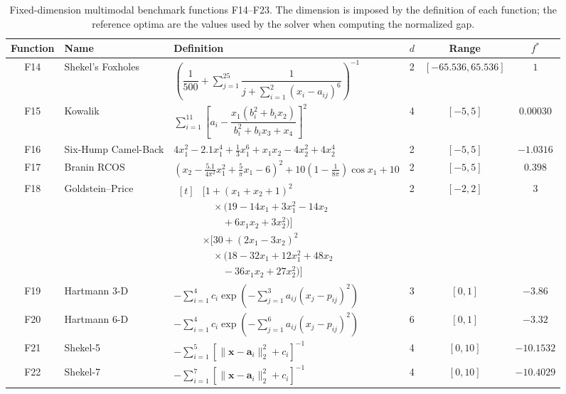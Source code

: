 \begin{table}[H]
\centering
\small
\caption{Fixed-dimension multimodal benchmark functions F14--F23. The dimension is imposed by the definition of each function; the reference optima are the values used by the solver when computing the normalized gap.}
\label{tab:benchmark_fixed}
\setlength{\tabcolsep}{4pt}
\begin{tabularx}{\textwidth}{c>{\raggedright\arraybackslash}p{2.1cm}>{\footnotesize\raggedright\arraybackslash}X ccc}
\toprule
\textbf{Function} & \textbf{Name} & \textbf{Definition} & \boldmath$d$ & \textbf{Range} & \boldmath$f^{*}$ \\
\midrule
F14 & Shekel's Foxholes & $\left(\dfrac{1}{500}+\sum_{j=1}^{25}\dfrac{1}{j+\sum_{i=1}^{2}(x_i-a_{ij})^{6}}\right)^{-1}$ & 2 & $[-65.536,65.536]$ & $1$ \\
F15 & Kowalik & $\sum_{i=1}^{11}\left[a_i-\dfrac{x_1\left(b_i^{2}+b_i x_2\right)}{b_i^{2}+b_i x_3+x_4}\right]^{2}$ & 4 & $[-5,5]$ & $0.00030$ \\
F16 & Six-Hump Camel-Back & $4x_1^{2}-2.1x_1^{4}+\tfrac{1}{3}x_1^{6}+x_1x_2-4x_2^{2}+4x_2^{4}$ & 2 & $[-5,5]$ & $-1.0316$ \\
F17 & Branin RCOS & $\left(x_2-\tfrac{5.1}{4\pi^{2}}x_1^{2}+\tfrac{5}{\pi}x_1-6\right)^{2}+10\left(1-\tfrac{1}{8\pi}\right)\cos x_1+10$ & 2 & $[-5,5]$ & $0.398$ \\
F18 & Goldstein--Price & $\begin{aligned}[t]&\big[1+(x_1+x_2+1)^2\\&\quad\times(19-14x_1+3x_1^2-14x_2\\&\qquad+6x_1x_2+3x_2^2)\big]\\&\times\big[30+(2x_1-3x_2)^2\\&\quad\times(18-32x_1+12x_1^2+48x_2\\&\qquad-36x_1x_2+27x_2^2)\big]\end{aligned}$ & 2 & $[-2,2]$ & $3$ \\
F19 & Hartmann 3-D & $-\sum_{i=1}^{4}c_i\exp\!\left(-\sum_{j=1}^{3}a_{ij}\left(x_j-p_{ij}\right)^{2}\right)$ & 3 & $[0,1]$ & $-3.86$ \\
F20 & Hartmann 6-D & $-\sum_{i=1}^{4}c_i\exp\!\left(-\sum_{j=1}^{6}a_{ij}\left(x_j-p_{ij}\right)^{2}\right)$ & 6 & $[0,1]$ & $-3.32$ \\
F21 & Shekel-5 & $-\sum_{i=1}^{5}\left[\|\mathbf{x}-\mathbf{a}_i\|_2^2+c_i\right]^{-1}$ & 4 & $[0,10]$ & $-10.1532$ \\
F22 & Shekel-7 & $-\sum_{i=1}^{7}\left[\|\mathbf{x}-\mathbf{a}_i\|_2^2+c_i\right]^{-1}$ & 4 & $[0,10]$ & $-10.4029$ \\

\end{tabularx}
\end{table}
